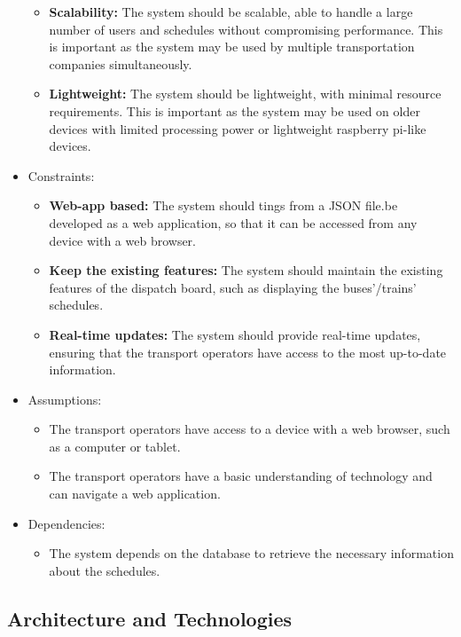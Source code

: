 \documentclass[10pt]{article}
\begin{document}
\begin{itemize}
\begin{itemize}
                    \item \textbf{Scalability:} The system should be scalable, able to handle a large number of users and schedules without compromising performance. This is important as the system may be used by multiple transportation companies simultaneously.
                    \item \textbf{Lightweight:} The system should be lightweight, with minimal resource requirements. This is important as the system may be used on older devices with limited processing power or lightweight raspberry pi-like devices.
                \end{itemize}
            \item Constraints:
                \begin{itemize}
                    \item \textbf{Web-app based:} The system should tings from a JSON file.be developed as a web application, so that it can be accessed from any device with a web browser.
                    \item \textbf{Keep the existing features:} The system should maintain the existing features of the dispatch board, such as displaying the buses'/trains' schedules.
                    \item \textbf{Real-time updates:} The system should provide real-time updates, ensuring that the transport operators have access to the most up-to-date information.
                \end{itemize}
            \item Assumptions:
                \begin{itemize}
                    \item The transport operators have access to a device with a web browser, such as a computer or tablet.
                    \item The transport operators have a basic understanding of technology and can navigate a web application.
                \end{itemize}
            \item Dependencies:
            \begin{itemize}
                \item The system depends on the database to retrieve the necessary information about the schedules.
            \end{itemize}
        \end{itemize}
        \subsection{Architecture and Technologies}
\end{document}

